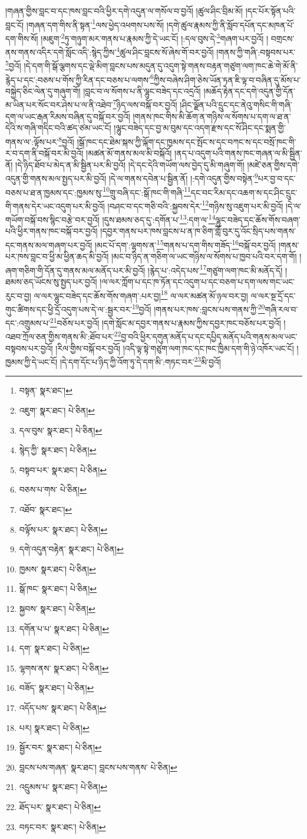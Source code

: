 །གཞན་གྱིས་བླང་བ་དང་ཁས་བླང་བའི་ཕྱིར་དགེ་འདུན་ལ་གསོལ་བ་བྱའོ། །ཚུལ་ཤིང་བྲིམ་མོ། །དང་པོར་སྟོན་པའི་བླང་ངོ། །གཞན་དག་གིས་ནི་སྟན་\footnote{བསྟན་  སྣར་ཐང་། }ལས་ཕྱེད་འཕགས་པས་སོ། །དགེ་ཚུལ་རྣམས་ཀྱི་ནི་སློབ་དཔོན་དང་མཁན་པོ་དག་གིས་སོ། །མཇུག་\footnote{འཇུག་  སྣར་ཐང་།  པེ་ཅིན། }ཏུ་གཉུག་མར་གནས་པ་རྣམས་ཀྱི་དེ་ཡང་ངོ། །:དལ་བུས་དེ་\footnote{དལ་བུས་  སྣར་ཐང་།  པེ་ཅིན། }གཞག་པར་བྱའོ། །
བགྲངས་ནས་གནས་འདིར་དགེ་སློང་འདི་:སྙེད་ཀྱིས་\footnote{སྙེད་ཀྱི་  སྣར་ཐང་།  པེ་ཅིན། }ཚུལ་ཤིང་བླངས་སོ་ཞེས་གོ་བར་བྱའོ། །གནས་ཀྱི་གཞི་:བསྟབས་པར་\footnote{བསྟབ་པར་  སྣར་ཐང་།  པེ་ཅིན། }བྱའོ། །དེ་དག་གི་སྒོ་ལྕགས་དང་ལྡེ་མིག་བླངས་པས་མདུན་དུ་འདུག་སྟེ་གནས་བརྟན་གཙུག་ལག་ཁང་ཆེ་གེ་མོ་ནི་རྙེད་པ་དང་:བཅས་པ་གོས་ཀྱི་རིན་དང་བཅས་པ་ལགས་\footnote{བཅས་པ་གས་  པེ་ཅིན། }ཀྱིས་བཞེས་ཤིག་ཅེས་ཡོན་ཏན་ཇི་ལྟ་བ་བཞིན་དུ་མོས་པ་བསྐྱེད་ཅིང་ལེན་དུ་གཞུག་གོ། །བླང་བ་ལ་སོགས་པ་ནི་ལྷུང་བཟེད་དང་འདྲའོ། །མཆོད་རྟེན་དང་དགེ་འདུན་གྱི་དོན་མ་ཡིན་པར་སོང་བར་ཤེས་པ་ལ་ནི་འཐེབ་\footnote{འཐོབ་  སྣར་ཐང་། }ཉིད་ལས་བསྐོ་བར་བྱའོ། །ཤིང་ལྗོན་པའི་དྲུང་དང་ནེའུ་གསིང་གི་གཞི་དག་ལ་ཡང་རྒན་རིམས་བཞིན་དུ་བསྐོ་བར་བྱའོ། །གནས་ཁང་གིས་མི་ཆོག་ན་གཉིས་ལ་སོགས་པ་དག་ལ་ཐ་ན་དེའི་ས་གཞི་གདིང་བའི་ཚད་ཙམ་ཡང་ངོ། །ལྷུང་བཟེད་དང་བྱ་མ་བུམ་དང་འདག་རྫས་དང་སོ་ཤིང་དང་སྨན་གྱི་གནས་ལ་:ལྟོས་པར་\footnote{བལྟོས་པར་  སྣར་ཐང་།  པེ་ཅིན། }བྱའོ། །སྒོ་ཁང་དང་ཐེམ་སྐས་ཀྱི་ལྐོག་དང་ཁྱམས་དང་སྤོང་ས་དང་བཀང་ས་དང་བསྲོ་ཁང་གི་ར་བ་དག་ནི་བསྐོ་བར་མི་བྱའོ། །མཚན་མོ་གནས་མལ་མི་བསྐོའོ། །ནད་པ་འདུག་པའི་གནས་ཁང་གཞན་ལ་མི་སྦྱིན་ནོ། །དེ་ཉིད་ཐོབ་པ་མེད་ན་མི་སྦྱིན་པར་མི་བྱའོ། །དེ་དང་དེའི་གཡོག་ལས་བྱེད་དུ་མི་གཞུག་གོ། །མཛེ་ཅན་གྱིས་དགེ་འདུན་གྱི་གནས་མལ་སྤྱད་པར་མི་བྱའོ། །དེ་ལ་གནས་དབེན་པ་སྦྱིན་ནོ། །:དགེ་འདུན་གྱིས་བསྟེན་\footnote{དགེ་འདུན་བརྟེན་  སྣར་ཐང་།  པེ་ཅིན། }པར་བྱ་བ་དང་བཅས་པ་ཐ་ན་ཁྱམས་དང་:ཁྱམས་སུ་\footnote{ཁྱམས་  སྣར་ཐང་།  པེ་ཅིན། }གྲུ་བཞི་དང་:སྒོ་ཁང་གི་གཞི་\footnote{སྒོ་ཁང་  སྣར་ཐང་།  པེ་ཅིན། }དང་བང་རིམ་དང་འཆག་ས་དང་ཤིང་དྲུང་གི་གནས་དེར་ཡང་འདུག་པར་མི་བྱའོ། །བཤང་བ་དང་གཅི་བའི་:སྐྱབས་དེར་\footnote{སྐྱབས་  སྣར་ཐང་།  པེ་ཅིན། }གཉིས་སུ་འཇུག་པར་མི་བྱའོ། །དེ་ལ་གཡོག་བསྐོ་བས་སྙིང་བརྩེ་བར་བྱའོ། །དུས་ཐམས་ཅད་དུ་:དགོན་པ་\footnote{དགོན་པ་པ་  སྣར་ཐང་།  པེ་ཅིན། }:དག་ལ་\footnote{དག་  སྣར་ཐང་།  པེ་ཅིན། }ལྷུང་བཟེད་དང་ཆོས་གོས་བཞག་པའི་ཕྱིར་གནས་ཁང་བསྐོ་བར་བྱའོ། །དབྱར་གནས་པར་ཁས་བླངས་པ་ན་ཁ་ཅིག་གློ་བུར་དུ་འོང་སྲིད་པས་གནས་དང་གནས་མལ་གཞག་པར་བྱའོ། །མང་པོ་དག་:ལྷགས་ན་\footnote{ལྷགས་ནས་  སྣར་ཐང་།  པེ་ཅིན། }གནས་པ་དག་གིས་གཟོད་\footnote{བཟོད་  སྣར་ཐང་།  པེ་ཅིན། }བསྐོ་བར་བྱའོ། །གནས་པར་ཁས་བླང་བ་ཕྱི་མ་ཕྱིན་ཆད་མི་བྱའོ། །མང་བ་ཉིད་ན་གཅིག་ལ་ཡང་གཉིས་ལ་སོགས་པ་ཁྱབ་པའི་བར་དག་གོ། །ཞག་གཅིག་གི་དོན་དུ་གནས་མལ་མནོད་པར་མི་བྱའོ། །རྙེད་པ་:འདེད་པས་\footnote{འདོད་པས་  སྣར་ཐང་།  པེ་ཅིན། }གཙུག་ལག་ཁང་མི་མནོད་དོ། །ཐམས་ཅད་ཡོངས་སུ་སྤྱད་པར་བྱའོ། །ལ་ལར་ཀློག་པ་དང་ཁ་ཏོན་དང་འདུག་པ་དང་བཅག་པ་དག་ལས་གང་ཡང་རུང་བ་བྱ། ལ་ལར་ལྷུང་བཟེད་དང་ཆོས་གོས་གཞག་:པར་བྱ།\footnote{པར།  སྣར་ཐང་།  པེ་ཅིན། } ལ་ལར་མཚན་མོ་ཉལ་བར་བྱ། ལ་ལར་སྔ་དྲོ་དང་གུང་ཚིགས་དང་ཕྱི་དྲོ་འདུག་པས་དེ་ལ་:སྦྱར་བར་\footnote{སྦྱོར་བར་  སྣར་ཐང་།  པེ་ཅིན། }བྱའོ། །གནས་པར་ཁས་:བླངས་པས་གནས་ཀྱི་\footnote{བླངས་པས་གཞན་  སྣར་ཐང་། བླངས་པས་གནས་  པེ་ཅིན། }གཞི་རལ་བ་དང་:འགྲུམས་པ་\footnote{འདྲུམས་པ་  སྣར་ཐང་།  པེ་ཅིན། }བཅོས་པར་བྱའོ། །དགེ་སློང་མ་དབྱར་གནས་པ་རྣམས་ཀྱིས་དབྱར་ཁང་བཅོས་པར་བྱའོ། །འཐབ་ཀྲོལ་ཅན་གྱིས་གནས་མི་:ཐོབ་པར་\footnote{ཐོད་པར་  སྣར་ཐང་།  པེ་ཅིན། }བྱ་བའི་ཕྱིར་དགུན་མནོད་པ་དང་དཔྱིད་མནོད་པའི་གནས་མལ་ཡང་བསྟབས་པར་བྱའོ། །རིལ་གྱིས་བསྐོ་བར་བྱའོ། །འདི་ལྟ་སྟེ་གཙུག་ལག་ཁང་དང་ཁང་ཁྱིམ་དག་གི་ཉེ་འཁོར་ཡང་ངོ། །ཁྱམས་ཀྱི་དེ་ཡང་ངོ། །དེ་དག་དོང་པ་ཉིད་ཀྱི་འོག་ཏུ་དེ་དག་མི་:གཏང་བར་\footnote{བཏང་བར་  སྣར་ཐང་།  པེ་ཅིན། }མི་བྱའོ། 